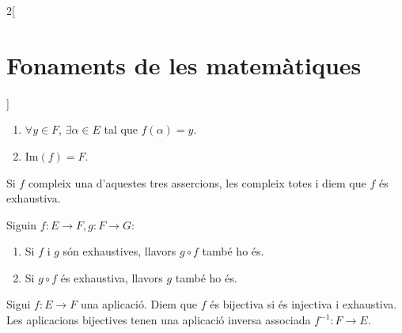 \documentclass[../../../main.tex]{subfiles}
\begin{document}
\begin{multicols}{2}[\section{Fonaments de les matemàtiques}]
\begin{definition}
\begin{enumerate}
    \item $\forall y\in F$, $\exists\alpha\in E$ tal que $f(\alpha)=y$.
    \item $\text{Im}(f)=F$.
\end{enumerate}
Si $f$ compleix una d'aquestes tres assercions, les compleix totes i diem que $f$ és exhaustiva.
\end{definition}
\begin{prop}
Siguin $f:E\rightarrow F,g:F\rightarrow G$:
\begin{enumerate}
    \item Si $f$ i $g$ són exhaustives, llavors $g\circ f$ també ho és.
    \item Si $g\circ f$ és exhaustiva, llavors $g$ també ho és.
\end{enumerate}
\end{prop}
\begin{definition}
Sigui $f:E\rightarrow F$ una aplicació. Diem que $f$ és bijectiva si és injectiva i exhaustiva. Les aplicacions bijectives tenen una aplicació inversa associada $f^{-1}:F\rightarrow E$.
\end{definition}

\end{multicols}
\end{document}
